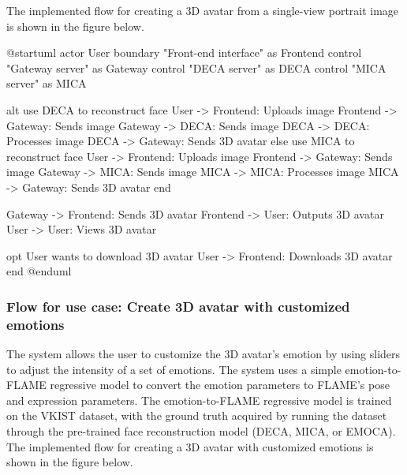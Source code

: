 The implemented flow for creating a 3D avatar from a single-view portrait image is shown in the figure below.

\begin{umlfigure}
    @startuml
    actor User
    boundary "Front-end interface" as Frontend
    control "Gateway server" as Gateway
    control "DECA server" as DECA
    control "MICA server" as MICA


    alt use DECA to reconstruct face
    User -> Frontend: Uploads image
    Frontend -> Gateway: Sends image
    Gateway -> DECA: Sends image
    DECA -> DECA: Processes image
    DECA -> Gateway: Sends 3D avatar
    else use MICA to reconstruct face
    User -> Frontend: Uploads image
    Frontend -> Gateway: Sends image
    Gateway -> MICA: Sends image
    MICA -> MICA: Processes image
    MICA -> Gateway: Sends 3D avatar
    end

    Gateway -> Frontend: Sends 3D avatar
    Frontend -> User: Outputs 3D avatar
    User -> User: Views 3D avatar

    opt User wants to download 3D avatar
    User -> Frontend: Downloads 3D avatar
    end
    @enduml
\end{umlfigure}

\clearpage

\subsubsection{Flow for use case: Create 3D avatar with customized emotions}
The system allows the user to customize the 3D avatar's emotion by using sliders to adjust the intensity of a set of emotions. The system uses a simple emotion-to-FLAME regressive model to convert the emotion parameters to FLAME's pose and expression parameters. The emotion-to-FLAME regressive model is trained on the VKIST dataset, with the ground truth acquired by running the dataset through the pre-trained face reconstruction model (DECA, MICA, or EMOCA). The implemented flow for creating a 3D avatar with customized emotions is shown in the figure below.

\clearpage

